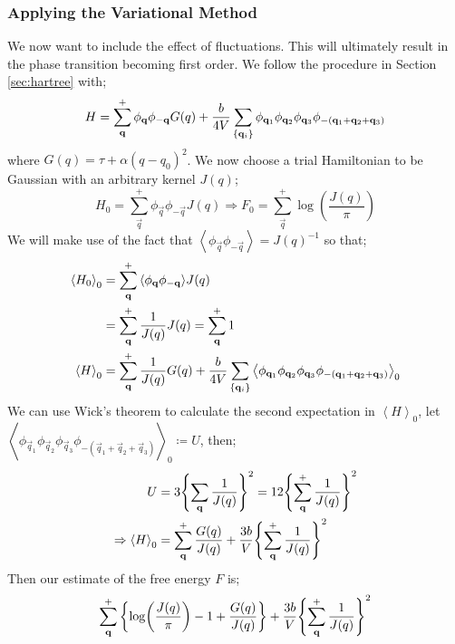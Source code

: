 \subsubsection{Applying the Variational Method}
We now want to include the effect of fluctuations. This will ultimately result in the phase transition becoming first order. We follow the procedure in Section \ref{sec:hartree} with;
\begin{equation}
H = \sum_{\vec{q}}^{+}{\phi_{\vec{q}}\phi_{-\vec{q}}G(q)} + \frac{b}{4V}\sum_{\set{\vec{q}_i}}{\phi_{\vec{q}_1}\phi_{\vec{q}_2}\phi_{\vec{q}_3}\phi_{-(\vec{q}_1 + \vec{q}_2 + \vec{q}_3)}}
\end{equation}
where $G(q) = \tau + \alpha(q-q_0)^2$. We now choose a trial Hamiltonian to be Gaussian with an arbitrary kernel $J(q)$;
\begin{equation}
H_0 = \sum_{\vec{q}}^{+}{\phi_{\vec{q}}\phi_{-\vec{q}}J(q)} \Rightarrow F_0 = \sum_{\vec{q}}^{+}{\log\left(\frac{J(q)}{\pi}\right)}
\end{equation}
We will make use of the fact that $\left< \phi_{\vec{q}} \phi_{-\vec{q}} \right> = J(q)^{-1}$ so that;
\begin{align*}
\left< H_0 \right>_0 &= \sum_{\vec{q}}^{+}{\left< \phi_{\vec{q}}\phi_{-\vec{q}} \right>J(q)} \\
&= \sum_{\vec{q}}^{+}{\frac{1}{J(q)}J(q)} = \sum_{\vec{q}}^{+}{1} \\
\left< H \right>_0 &= \sum_{\vec{q}}^{+}{\frac{1}{J(q)} G(q)} + \frac{b}{4V}\sum_{\set{\vec{q}_i}}{\left< \phi_{\vec{q}_1}\phi_{\vec{q}_2}\phi_{\vec{q}_3}\phi_{-(\vec{q}_1 + \vec{q}_2 + \vec{q}_3)} \right>_0}
\end{align*}
We can use Wick's theorem to calculate the second expectation in $\left< H \right>_0$, let $\left< \phi_{\vec{q}_1}\phi_{\vec{q}_2}\phi_{\vec{q}_3}\phi_{-(\vec{q}_1 + \vec{q}_2 + \vec{q}_3)} \right>_0 \coloneqq U$, then;
\begin{align*}
U &= 3\set{\sum_{\vec{q}}{\frac{1}{J(q)}}}^2 = 12 \set{\sum_{\vec{q}}^{+}{\frac{1}{J(q)}}}^2 \\
\Rightarrow \left< H \right>_0 &= \sum_{\vec{q}}^{+}{\frac{G(q)}{J(q)}} + \frac{3b}{V} \set{\sum_{\vec{q}}^{+}{\frac{1}{J(q)}}}^2
\end{align*}
Then our estimate of the free energy $F$ is;
\begin{equation}
\sum_{\vec{q}}^{+}{\set{\log\left(\frac{J(q)}{\pi}\right) - 1 + \frac{G(q)}{J(q)}}} + \frac{3b}{V} \set{\sum_{\vec{q}}^{+}{\frac{1}{J(q)}}}^2
\end{equation}
